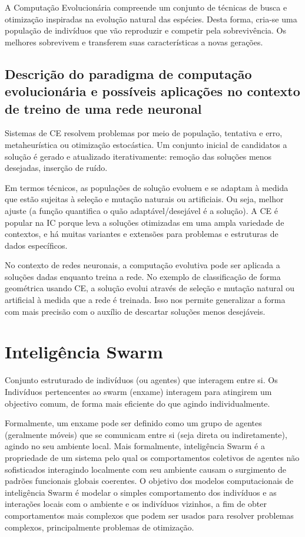 \documentclass[10pt]{article}
\begin{document}
A Computação Evolucionária compreende um conjunto de técnicas de busca e otimização inspiradas na 
evolução natural das espécies. Desta forma, cria-se uma população de indivíduos que vão reproduzir e 
competir pela sobrevivência. Os melhores sobrevivem e transferem suas características a novas gerações.


\subsection{Descrição do paradigma de computação evolucionária e possíveis aplicações no contexto de treino de uma rede neuronal}\label{sec:desc-para}

Sistemas de CE resolvem problemas por meio de população, 
tentativa e erro, metaheurística ou otimização estocástica. Um 
conjunto inicial de candidatos a solução é gerado e 
atualizado iterativamente: remoção das 
soluções menos desejadas, inserção de ruído.

Em termos técnicos, as populações de solução evoluem e 
se adaptam à medida que estão sujeitas à seleção e mutação 
naturais ou artificiais. Ou seja, melhor ajuste (a função 
quantifica o  quão adaptável/desejável é a solução). 
A CE é popular na IC porque leva a soluções otimizadas 
em uma ampla variedade de contextos, e há 
muitas variantes e extensões para problemas e 
estruturas de dados específicos.

No contexto de redes neuronais, a computação evolutiva pode 
ser aplicada a soluções dadas enquanto treina a rede. 
No exemplo de classificação de forma geométrica usando CE, 
a solução evolui através de seleção e mutação natural
ou artificial à medida que a rede é treinada.
Isso nos permite generalizar a forma com mais precisão com o 
auxílio de descartar soluções menos desejáveis.

\newpage
\section{Inteligência Swarm}\label{sec:ev-da-org}
Conjunto estruturado de indivíduos (ou agentes) que interagem entre si.
Os Indivíduos pertencentes ao swarm (enxame) interagem para atingirem um objectivo comum,
de forma mais eficiente do que agindo individualmente.

Formalmente, um enxame pode ser definido como um grupo de agentes (geralmente móveis) que se comunicam entre si (seja direta ou indiretamente), agindo no seu ambiente local.
 Mais formalmente, inteligência Swarm é a propriedade de um sistema pelo qual os comportamentos coletivos de agentes não sofisticados interagindo localmente com seu ambiente causam o surgimento de padrões funcionais globais coerentes.
 O objetivo dos modelos computacionais de inteligência Swarm é modelar o simples
comportamento dos indivíduos e as interações locais com o ambiente e os indivíduos vizinhos, a fim de obter comportamentos mais complexos que podem ser usados para resolver problemas complexos, principalmente problemas de otimização.
\end{document}
